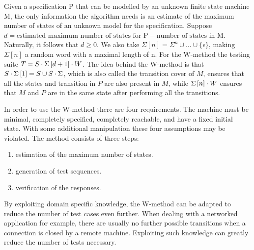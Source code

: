 \documentclass[multi,crop=false,class=article]{standalone}
\begin{document}
Given a specification P that can be modelled by an unknown finite state machine M,
the only information the algorithm needs is an estimate of the maximum number of
states of an unknown model for the specification.
Suppose $d = \text{estimated maximum number of states for P}
- \text{number of states in M}$.
Naturally, it follows that $d \geq 0$.
We also take $\Sigma \left[ n \right] = \Sigma^{n} \cup \dots \cup \lbrace \epsilon \rbrace$,
making $\Sigma\left[ n \right]$ a random word with a maximal length of n.
For the W-method the testing suite $T = S \cdot \Sigma\left[ d + 1 \right]  \cdot W$.
The idea behind the W-method is that $S \cdot \Sigma\left[ 1 \right]  = S \cup S
\cdot \Sigma$, which is also called the transition cover of $M$, ensures that all the
states and transition in $P$ are also present in $M$, while
$\Sigma\left[ n \right] \cdot W$ ensures that $M$ and $P$ are in the same state after
performing all the transitions.

In order to use the W-method there are four requirements.
The machine must be minimal, completely specified, completely reachable, 
and have a fixed initial state.
With some additional manipulation these four assumptions may be violated.
The method consists of three steps:
\begin{enumerate}
\item estimation of the maximum number of states.
\item generation of test sequences.
\item verification of the responses.
\end{enumerate}

By exploiting domain specific knowledge, the W-method can be adapted to reduce
the number of test cases even further.
When dealing with a networked application for example, there are usually no
further possible transitions when a connection is closed by a remote machine.
Exploiting such knowledge can greatly reduce the number of tests necessary\cite{deRuiter15}.
\end{document}

